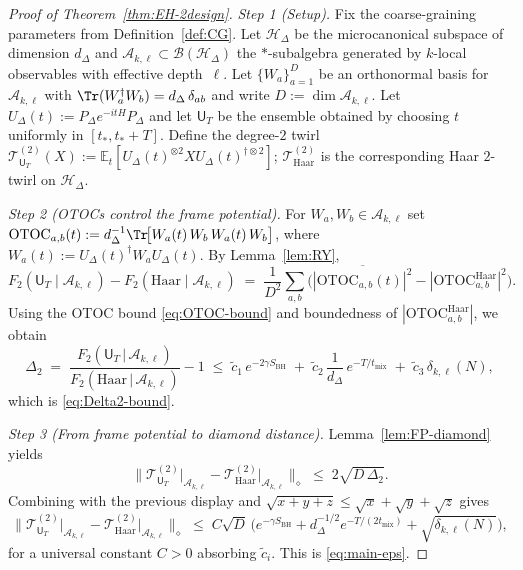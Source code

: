 \documentclass[aps,prd,preprint,onecolumn,superscriptaddress,nofootinbib,longbibliography,floatfix,11pt,showpacs,showkeys]{revtex4-2}
\theoremstyle{plain}
\theoremstyle{definition}
\theoremstyle{remark}
\begin{document}
\begin{proof}[Proof of Theorem~\ref{thm:EH-2design}]
\emph{Step 1 (Setup).} Fix the coarse-graining parameters from Definition~\ref{def:CG}. Let $\mathcal{H}_\Delta$
be the microcanonical subspace of dimension $d_\Delta$ and $\mathscr{A}_{k,\ell}\subset\mathcal{B}(\mathcal{H}_\Delta)$ the
$*$-subalgebra generated by $k$-local observables with effective depth~$\ell$. Let $\{W_a\}_{a=1}^{D}$ be an orthonormal basis
for $\mathscr{A}_{k,\ell}$ with $\Tr(W_a^\dagger W_b)=d_\Delta\,\delta_{ab}$ and write $D:=\dim\mathscr{A}_{k,\ell}$.
Let $U_\Delta(t):=P_\Delta e^{-itH}P_\Delta$ and let $\mathsf{U}_T$ be the ensemble obtained by choosing $t$ uniformly
in $[t_\ast,t_\ast+T]$. Define the degree-$2$ twirl
$\mathcal{T}^{(2)}_{\mathsf{U}_T}(X):=\mathbb{E}_{t}\!\left[U_\Delta(t)^{\otimes2} X U_\Delta(t)^{\dagger\otimes2}\right]$;
$\mathcal{T}^{(2)}_{\mathrm{Haar}}$ is the corresponding Haar $2$-twirl on $\mathcal{H}_\Delta$.

\emph{Step 2 (OTOCs control the frame potential).} For $W_a,W_b\in\mathscr{A}_{k,\ell}$ set
$\mathrm{OTOC}_{a,b}(t):=d_\Delta^{-1}\Tr\!\big[W_a(t)\,W_b\,W_a(t)\,W_b\big]$, where $W_a(t):=U_\Delta(t)^\dagger W_a U_\Delta(t)$.
By Lemma~\ref{lem:RY},
\begin{equation*}
  F_2(\mathsf{U}_T \!\mid\! \mathscr{A}_{k,\ell})-F_2(\mathrm{Haar}\!\mid\!\mathscr{A}_{k,\ell})
  \;=\; \frac{1}{D^2}\sum_{a,b}\Big(\overline{|\mathrm{OTOC}_{a,b}(t)|^2}-|\mathrm{OTOC}^{\mathrm{Haar}}_{a,b}|^2\Big).
\end{equation*}
Using the OTOC bound \eqref{eq:OTOC-bound} and boundedness of $|\mathrm{OTOC}^{\mathrm{Haar}}_{a,b}|$, we obtain
\begin{equation*}
 \Delta_2 \;=\; \frac{F_2(\mathsf{U}_T \,|\, \mathscr{A}_{k,\ell})}{F_2(\mathrm{Haar} \,|\, \mathscr{A}_{k,\ell})}-1
 \;\le\; \tilde c_1\, e^{-2\gamma S_{\mathrm{BH}}} \;+\; \tilde c_2\, \frac{1}{d_\Delta}\, e^{-T/t_{\mathrm{mix}}}
 \;+\; \tilde c_3\, \delta_{k,\ell}(N),
\end{equation*}
which is \eqref{eq:Delta2-bound}.

\emph{Step 3 (From frame potential to diamond distance).} Lemma~\ref{lem:FP-diamond} yields
\begin{equation*}
 \Big\| \mathcal{T}^{(2)}_{\mathsf{U}_T}\big|_{\mathscr{A}_{k,\ell}} - \mathcal{T}^{(2)}_{\mathrm{Haar}}\big|_{\mathscr{A}_{k,\ell}} \Big\|_{\diamond}
 \;\le\; 2\sqrt{D\,\Delta_2}.
\end{equation*}
Combining with the previous display and $\sqrt{x+y+z}\le \sqrt{x}+\sqrt{y}+\sqrt{z}$ gives
\begin{equation*}
 \Big\| \mathcal{T}^{(2)}_{\mathsf{U}_T}\big|_{\mathscr{A}_{k,\ell}} - \mathcal{T}^{(2)}_{\mathrm{Haar}}\big|_{\mathscr{A}_{k,\ell}} \Big\|_{\diamond}
 \;\le\; C \sqrt{D}\,\Big( e^{-\gamma S_{\mathrm{BH}}} + d_\Delta^{-1/2} e^{-T/(2t_{\mathrm{mix}})} + \sqrt{\delta_{k,\ell}(N)} \Big),
\end{equation*}
for a universal constant $C>0$ absorbing $\tilde c_i$. This is \eqref{eq:main-eps}.


\end{proof}
\end{document}
